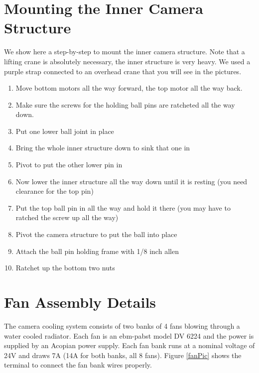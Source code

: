 \documentclass[11pt]{article}
\begin{document}
\section{Mounting the Inner Camera Structure}
We show here a step-by-step to mount the inner camera structure.  
Note that a lifting crane is absolutely necessary, the inner structure is very heavy.
We used a purple strap connected to an overhead crane that you will see in the pictures.

\begin{enumerate}
\item Move bottom motors all the way forward, the top motor all the way back.
\item Make sure the screws for the holding ball pins are ratcheted all the way down.
\item Put one lower ball joint in place
\item Bring the whole inner structure down to sink that one in
\item Pivot to put the other lower pin in
\item Now lower the inner structure all the way down until it is resting (you need clearance for the top pin)
\item Put the top ball pin in all the way and hold it there (you may have to ratched the screw up all the way)
\item Pivot the camera structure to put the ball into place 
\item Attach the ball pin holding frame with 1/8 inch allen
\item Ratchet up the bottom two nuts
\end{enumerate}


\newpage
\section{Fan Assembly Details}

The camera cooling system consists of two banks of 4 fans blowing through a water cooled radiator.
Each fan is an ebm-pabst model DV 6224 and the power is supplied by an Acopian power supply.
Each fan bank runs at a nominal voltage of 24V and draws 7A (14A for both banks, all 8 fans).
Figure \ref{fanPic} shows the terminal to connect the fan bank wires properly.
\end{document}
